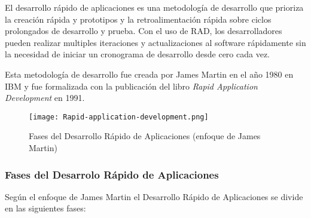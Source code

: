 El desarrollo rápido de aplicaciones es una metodología de desarrollo que prioriza la creación rápida y prototipos y la retroalimentación rápida sobre ciclos prolongados de desarrollo y prueba. Con el uso de RAD, los desarrolladores pueden realizar multiples iteraciones y actualizaciones al software rápidamente sin la necesidad de iniciar un cronograma de desarrollo desde cero cada vez.

Esta metodología de desarrollo fue creada por James Martin en el año 1980 en IBM y fue formalizada con la publicación del libro \emph{Rapid Application Development} en 1991.

\begin{figure}[H]
    \texttt{[image: Rapid-application-development.png]}
    \caption{Fases del Desarrollo Rápido de Aplicaciones (enfoque de James Martin)}
    \label{fig:Rapid-application-development}
\end{figure}

\subsubsection{Fases del Desarrolo Rápido de Aplicaciones}

Según el enfoque de James Martin \cite{RADJamesMartin} el Desarrollo Rápido de Aplicaciones se divide en las siguientes fases:

